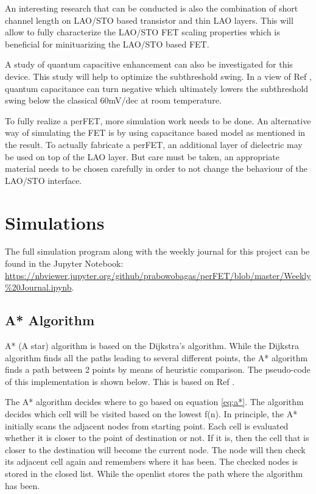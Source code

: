 \documentclass[11pt,a4paper]{report}
\begin{document}
An interesting research that can be conducted is also the combination of short channel length on LAO/STO based transistor \cite{woltmann_harada_boschker_srot_aken_klauk_mannhart_2015} and thin LAO layers. This will allow to fully characterize the LAO/STO FET scaling properties which is beneficial for minituarizing the LAO/STO based FET.

A study of quantum capacitive enhancement can also be investigated for this device. This study will help to optimize the subthreshold swing. In a view of Ref \cite{li_Large_capacitance_enhancement_2011}, quantum capacitance can turn negative which ultimately lowers the subthreshold swing below the classical 60mV/dec at room temperature.

To fully realize a perFET, more simulation work needs to be done. An alternative way of simulating the FET is by using capacitance based model as mentioned in the result. To actually fabricate a perFET, an additional layer of dielectric may be used on top of the LAO layer. But care must be taken, an appropriate material needs to be chosen carefully in order to not change the behaviour of the LAO/STO interface. 

\appendix
\chapter{Simulations}
The full simulation program along with the weekly journal for this project can be found in the Jupyter Notebook: \url{https://nbviewer.jupyter.org/github/prabowobagas/perFET/blob/master/Weekly\%20Journal.ipynb}.

\section{A* Algorithm}
A* (A star) algorithm is based on the Dijkstra's algorithm. While the Dijkstra algorithm finds all the paths leading to several different points, the A* algorithm finds a path between 2 points by means of heuristic comparison. The pseudo-code of this implementation is shown below. This is based on Ref \cite{A*search}.

The A* algorithm decides where to go based on equation \ref{eq:a*}. The algorithm decides which cell will be visited based on the lowest f(n). In principle, the A* initially scans the adjacent nodes from starting point. Each cell is evaluated whether it is closer to the point of destination or not. If it is, then the cell that is closer to the destination will become the current node. The node will then check its adjacent cell again and remembers where it has been. The checked nodes is stored in the closed list. While the openlist stores the path where the algorithm has been.
\end{document}
